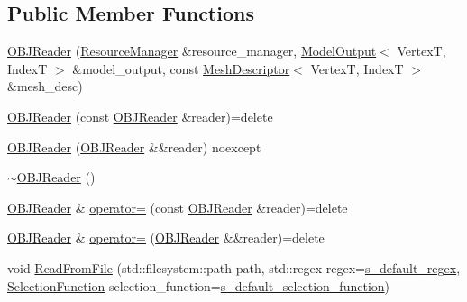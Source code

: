 \subsection*{Public Member Functions}
\begin{DoxyCompactItemize}
\item 
\mbox{\hyperlink{classmage_1_1rendering_1_1loader_1_1_o_b_j_reader_a5fe68a545e05c266b69f35e4dc9027a9}{O\+B\+J\+Reader}} (\mbox{\hyperlink{classmage_1_1rendering_1_1_resource_manager}{Resource\+Manager}} \&resource\+\_\+manager, \mbox{\hyperlink{structmage_1_1rendering_1_1_model_output}{Model\+Output}}$<$ VertexT, IndexT $>$ \&model\+\_\+output, const \mbox{\hyperlink{classmage_1_1rendering_1_1_mesh_descriptor}{Mesh\+Descriptor}}$<$ VertexT, IndexT $>$ \&mesh\+\_\+desc)
\item 
\mbox{\hyperlink{classmage_1_1rendering_1_1loader_1_1_o_b_j_reader_a1ba7402bf27180682de9109a3d0d031f}{O\+B\+J\+Reader}} (const \mbox{\hyperlink{classmage_1_1rendering_1_1loader_1_1_o_b_j_reader}{O\+B\+J\+Reader}} \&reader)=delete
\item 
\mbox{\hyperlink{classmage_1_1rendering_1_1loader_1_1_o_b_j_reader_afa0ab677916b17126aa4fc202c52684e}{O\+B\+J\+Reader}} (\mbox{\hyperlink{classmage_1_1rendering_1_1loader_1_1_o_b_j_reader}{O\+B\+J\+Reader}} \&\&reader) noexcept
\item 
\mbox{\hyperlink{classmage_1_1rendering_1_1loader_1_1_o_b_j_reader_a2b10c4cbb4c4aea192c78045beb4735e}{$\sim$\+O\+B\+J\+Reader}} ()
\item 
\mbox{\hyperlink{classmage_1_1rendering_1_1loader_1_1_o_b_j_reader}{O\+B\+J\+Reader}} \& \mbox{\hyperlink{classmage_1_1rendering_1_1loader_1_1_o_b_j_reader_a006549a7f9724580c7fdae2f7a9c7bdf}{operator=}} (const \mbox{\hyperlink{classmage_1_1rendering_1_1loader_1_1_o_b_j_reader}{O\+B\+J\+Reader}} \&reader)=delete
\item 
\mbox{\hyperlink{classmage_1_1rendering_1_1loader_1_1_o_b_j_reader}{O\+B\+J\+Reader}} \& \mbox{\hyperlink{classmage_1_1rendering_1_1loader_1_1_o_b_j_reader_ad35fe46e20179ce1cd79386501ee0959}{operator=}} (\mbox{\hyperlink{classmage_1_1rendering_1_1loader_1_1_o_b_j_reader}{O\+B\+J\+Reader}} \&\&reader)=delete
\item 
void \mbox{\hyperlink{classmage_1_1rendering_1_1loader_1_1_o_b_j_reader_aba8857b3d0f49250e312bd737d7d0e9c}{Read\+From\+File}} (std\+::filesystem\+::path path, std\+::regex regex=\mbox{\hyperlink{classmage_1_1_line_reader_a6713da665d123ab39293c0c5a4e8e1de}{s\+\_\+default\+\_\+regex}}, \mbox{\hyperlink{classmage_1_1_line_reader_a17bbae61a3ce30bdb251d6c76e1a4522}{Selection\+Function}} selection\+\_\+function=\mbox{\hyperlink{classmage_1_1_line_reader_a93da10f6f69b44accfec8074712f35de}{s\+\_\+default\+\_\+selection\+\_\+function}})

\end{DoxyCompactItemize}
